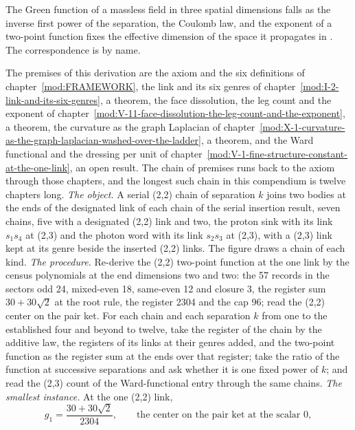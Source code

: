 \begin{chbridge}
The Green function of a massless field in three spatial dimensions falls as the inverse first power of the separation, the Coulomb law, and the exponent of a two-point function fixes the effective dimension of the space it propagates in \cite{Jackson1998,Peskin1995}. The correspondence is by name.
\end{chbridge}
\begin{chproof}
The premises of this derivation are the axiom and the six definitions of chapter~\ref{mod:FRAMEWORK}, the link and its six genres of chapter~\ref{mod:I-2-link-and-its-six-genres}, a theorem, the face dissolution, the leg count and the exponent of chapter~\ref{mod:V-11-face-dissolution-the-leg-count-and-the-exponent}, a theorem, the curvature as the graph Laplacian of chapter~\ref{mod:X-1-curvature-as-the-graph-laplacian-washed-over-the-ladder}, a theorem, and the Ward functional and the dressing per unit of chapter~\ref{mod:V-1-fine-structure-constant-at-the-one-link}, an open result. The chain of premises runs back to the axiom through those chapters, and the longest such chain in this compendium is twelve chapters long.
\textit{The object.} A serial (2,2) chain of separation $k$ joins two bodies at the ends of the designated link of each chain of the serial insertion result, seven chains, five with a designated (2,2) link and two, the proton sink with its link $s_{1}s_{4}$ at (2,3) and the photon word with its link $s_{2}s_{3}$ at (2,3), with a (2,3) link kept at its genre beside the inserted (2,2) links. The figure draws a chain of each kind.
\textit{The procedure.} Re-derive the (2,2) two-point function at the one link by the census polynomials at the end dimensions two and two: the 57 records in the sectors odd 24, mixed-even 18, same-even 12 and closure 3, the register sum $30 + 30\sqrt{2}$ at the root rule, the register 2304 and the cap 96; read the (2,2) center on the pair ket. For each chain and each separation $k$ from one to the established four and beyond to twelve, take the register of the chain by the additive law, the registers of its links at their genres added, and the two-point function as the register sum at the ends over that register; take the ratio of the function at successive separations and ask whether it is one fixed power of $k$; and read the (2,3) count of the Ward-functional entry through the same chains.
\textit{The smallest instance.} At the one (2,2) link,
\begin{equation} g_{1} = \frac{30 + 30\sqrt{2}}{2304}, \qquad \text{the center on the pair ket at the scalar } 0, \end{equation}

\end{chproof}

